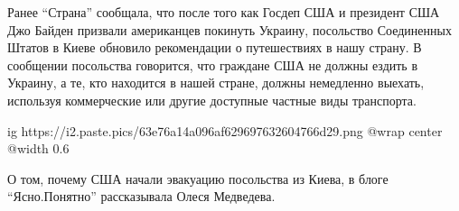 Ранее \enquote{Страна} сообщала, что после того как Госдеп США и президент США
Джо Байден призвали американцев покинуть Украину, посольство Соединенных Штатов
в Киеве обновило рекомендации о путешествиях в нашу страну. В сообщении
посольства говорится, что граждане США не должны ездить в Украину, а те, кто
находится в нашей стране, должны немедленно выехать, используя коммерческие или
другие доступные частные виды транспорта.

\ifcmt
  ig https://i2.paste.pics/63e76a14a096af629697632604766d29.png
  @wrap center
  @width 0.6
\fi

О том, почему США начали эвакуацию посольства из Киева, в блоге
\enquote{Ясно.Понятно} рассказывала Олеся Медведева.
